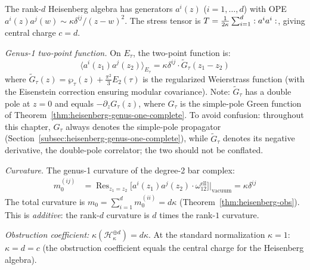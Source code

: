 \begin{computation}
\label{comp:rank-d-heisenberg-genus1}

The rank-$d$ Heisenberg algebra has generators
$a^i(z)$ ($i = 1, \ldots, d$) with OPE
$a^i(z) a^j(w) \sim \kappa \delta^{ij}/(z-w)^2$.
The stress tensor is $T = \frac{1}{2\kappa} \sum_{i=1}^d
:{a^i a^i}:$, giving central charge $c = d$.

\emph{Genus-1 two-point function.}
On $E_\tau$, the two-point function is:
\[
\langle a^i(z_1) a^j(z_2) \rangle_{E_\tau}
= \kappa \delta^{ij} \cdot \widetilde{G}_\tau(z_1 - z_2)
\]
where $\widetilde{G}_\tau(z) = \wp_\tau(z) + \frac{\pi^2}{3} E_2(\tau)$
is the regularized Weierstrass function (with the Eisenstein
correction ensuring modular covariance).  Note: $\widetilde{G}_\tau$ has a double pole at $z=0$ and equals $-\partial_z G_\tau(z)$, where $G_\tau$ is the simple-pole Green function of Theorem~\ref{thm:heisenberg-genus-one-complete}.  To avoid confusion: throughout this chapter, $G_\tau$ always denotes the simple-pole propagator (Section~\ref{subsec:heisenberg-genus-one-complete}), while $\widetilde{G}_\tau$ denotes its negative derivative, the double-pole correlator; the two should not be conflated.

\emph{Curvature.}
The genus-1 curvature of the degree-2 bar complex:
\begin{align}
m_0^{(ij)} &= \operatorname{Res}_{z_1 = z_2}
\bigl[a^i(z_1) a^j(z_2) \cdot
\omega_{12}^{\mathrm{ell}}\bigr]\big|_{\text{vacuum}}
= \kappa \delta^{ij} \label{eq:rank-d-curvature}
\end{align}
The total curvature is $m_0 = \sum_{i=1}^d m_0^{(ii)} = d\kappa$
(Theorem~\ref{thm:heisenberg-obs}).  This is \emph{additive}:
the rank-$d$ curvature is $d$ times the rank-$1$ curvature.

\emph{Obstruction coefficient:} $\kappa(\mathcal{H}_\kappa^{\oplus d})
= d\kappa$.  At the standard normalization $\kappa = 1$:
$\kappa = d = c$ (the obstruction coefficient equals the central
charge for the Heisenberg algebra).


\end{computation}
